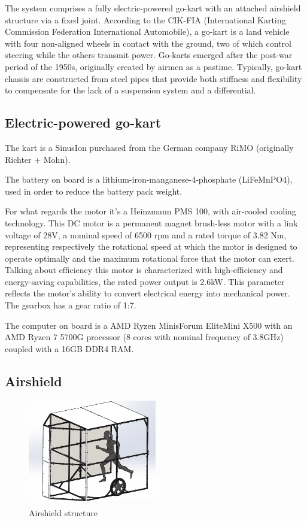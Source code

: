 \documentclass[a4paper,12pt,oneside]{book}
\begin{document}
\bigskip
The system comprises a fully electric-powered go-kart with an attached airshield structure via a fixed joint. According to the CIK-FIA (International Karting Commission Federation International Automobile), a go-kart is a land vehicle with four non-aligned wheels in contact with the ground, two of which control steering while the others transmit power. Go-karts emerged after the post-war period of the 1950s, originally created by airmen as a pastime. Typically, go-kart chassis are constructed from steel pipes that provide both stiffness and flexibility to compensate for the lack of a suspension system and a differential.

\subsection*{Electric-powered go-kart}
The kart is a SinusIon purchased from the German company RiMO (originally Richter + Mohn). 

\bigskip
The battery on board is a lithium-iron-manganese-4-phosphate (LiFeMnPO4), used in order to reduce the battery pack weight.

\bigskip
For what regards the motor it's a Heinzmann PMS 100, with air-cooled cooling technology. 
This DC motor is a permanent magnet brush-less motor with a link voltage of 28V, a nominal speed of 6500 rpm and a rated torque of 3.82 Nm, representing respectively the rotational speed at which the motor is designed to operate optimally and the maximum rotational force that the motor can exert.
Talking about efficiency this motor is characterized with high-efficiency and energy-saving capabilities, the rated power output is 2.6kW. 
This parameter reflects the motor's ability to convert electrical energy into mechanical power.
The gearbox has a gear ratio of 1:7.

\bigskip
The computer on board is a AMD Ryzen MinisForum EliteMini X500 with an AMD Ryzen 7 5700G processor (8 cores with nominal frequency of 3.8GHz) coupled with a 16GB DDR4 RAM.

\subsection*{Airshield}

\begin{figure}
	\centering
	\includegraphics[width=0.5\textwidth]{Shield_structure.png}
\caption{Airshield structure}
\label{Shield_structure}
\end{figure}
\end{document}
